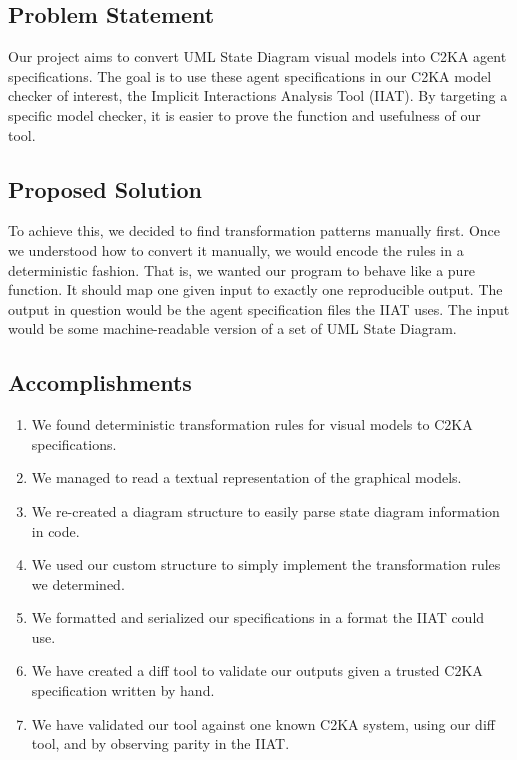 \subsection{Problem Statement}\label{subsec:problem-statement}
Our project aims to convert UML State Diagram visual models into C2KA agent specifications.
The goal is to use these agent specifications in our C2KA model checker of interest, the Implicit Interactions Analysis Tool (IIAT).
By targeting a specific model checker, it is easier to prove the function and usefulness of our tool.

\subsection{Proposed Solution}\label{subsec:proposed-solution}
To achieve this, we decided to find transformation patterns manually first.
Once we understood how to convert it manually, we would encode the rules in a deterministic fashion.
That is, we wanted our program to behave like a pure function.
It should map one given input to exactly one reproducible output.
The output in question would be the agent specification files the IIAT uses.
The input would be some machine-readable version of a set of UML State Diagram.

\subsection{Accomplishments}\label{subsec:accomplishments}
\begin{enumerate}
    \item We found deterministic transformation rules for visual models to C2KA specifications.
    \item We managed to read a textual representation of the graphical models.
    \item We re-created a diagram structure to easily parse state diagram information in code.
    \item We used our custom structure to simply implement the transformation rules we determined.
    \item We formatted and serialized our specifications in a format the IIAT could use.
    \item We have created a diff tool to validate our outputs given a trusted C2KA specification written by hand.
    \item We have validated our tool against one known C2KA system, using our diff tool, and by observing parity in the IIAT\@.
\end{enumerate}

